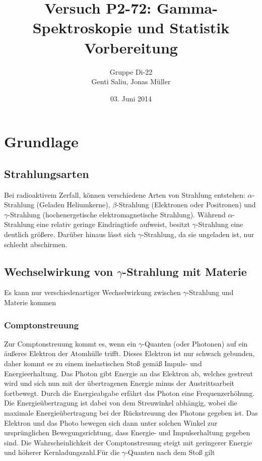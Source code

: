 \documentclass[a4paper,titlepage]{scrartcl}
\title{Versuch P2-72: Gamma-Spektroskopie und Statistik\\Vorbereitung}
\author{Gruppe Di-22\\Genti Saliu, Jonas Müller}
\date{03. Juni 2014}
\numberwithin{equation}{section}
\begin{document}
	\begin{titlepage}
		\maketitle
		\thispagestyle{empty}
	\end{titlepage}
	
\newpage
{}
\tableofcontents

\newpage
{}
\section{Grundlage}
\subsection{Strahlungsarten}

Bei radioaktivem Zerfall, können verschiedene Arten von Strahlung entstehen: $\alpha $-Strahlung (Geladen Heliumkerne), $\beta$-Strahlung (Elektronen oder Positronen) und $\gamma $-Strahlung (hochenergetische elektromagnetische Strahlung). Während $\alpha $-Strahlung eine relativ geringe Eindringtiefe aufweist, besitzt $\gamma $-Strahlung eine deutlich größere. Darüber hinaus lässt sich $\gamma$-Strahlung, da sie ungeladen ist, nur schlecht abschirmen.

\subsection{Wechselwirkung von $\gamma$-Strahlung mit Materie}

Es kann nur verschiedenartiger Wechselwirkung zwischen $\gamma $-Strahlung und Materie kommen

\subsubsection{Comptonstreuung}
Zur Comptonstreuung kommt es, wenn ein $\gamma $-Quanten (oder Photonen) auf ein äußeres Elektron der Atomhülle trifft. Dieses Elektron ist nur schwach gebunden, daher kommt es zu einem inelastischen Stoß gemäß Impuls- und Energieerhaltung. Das Photon gibt Energie an das Elektron ab, welches gestreut wird und sich nun mit der übertragenen Energie minus der Austrittsarbeit fortbewegt. Durch die Energieabgabe erfährt das Photon eine Frequenzerhöhung. Die Energieübertragung ist dabei von dem Streuwinkel abhängig, wobei die maximale Energieübertragung bei der Rückstreuung des Photons gegeben ist. Das Elektron und das Photo bewegen sich dann unter solchen Winkel zur ursprünglichen Bewegungsrichtung, dass Energie- und Impulserhaltung gegeben sind. Die Wahrscheinlichkeit der Comptonstreuung steigt mit geringerer Energie und höherer Kernladungszahl.Für die $\gamma $-Quanten nach dem Stoß gilt
\end{document}
